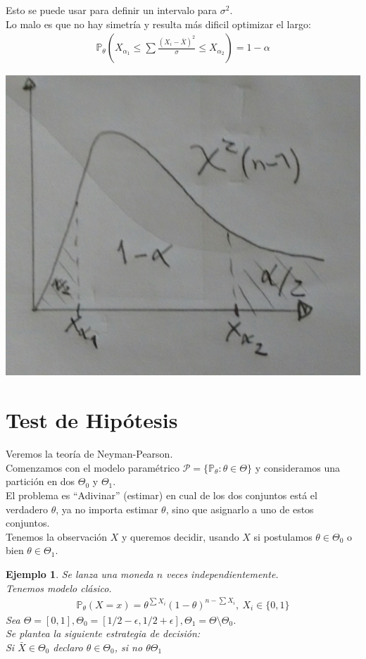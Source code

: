 \documentclass[10pt]{article}
\theoremstyle{plain}
\newtheorem{ej}{Ejemplo}
\theoremstyle{definition}
\begin{document}
 Esto se puede usar para definir un intervalo para $\sigma^2$.\\
 Lo malo es que no hay simetría y resulta más dificil optimizar el largo:
 \begin{align*}
 \mathbb{P}_{\theta}(X_{\alpha_{1}}\le \sum {\frac{(X_{i}-\bar{X})^2}{\sigma}} \le X_{\alpha_{2}}) = 1-\alpha
 \end{align*}
 \begin{center}
 \includegraphics[scale=0.2]{imagenes/distr3.jpg}
 \end{center}
 \section{Test de Hipótesis}
 Veremos la teoría de Neyman-Pearson.\\
 
 Comenzamos con el modelo paramétrico $\mathcal{P} = \{\mathbb{P}_{\theta}\colon \theta \in \Theta\}$ y consideramos una partición en dos $\Theta_{0}$ y $\Theta_{1}$.\\
 
 El problema es ``Adivinar'' (estimar) en cual de los dos conjuntos está el verdadero $\theta$, ya no importa estimar $\theta$, sino que asignarlo a uno de estos conjuntos.\\
 
 Tenemos la observación $X$ y queremos decidir, usando $X$ si postulamos $\theta \in \Theta_{0}$ o bien $\theta \in \Theta_{1}$.
 
 \begin{ej}
 Se lanza una moneda $n$ veces independientemente.\\
 Tenemos modelo clásico.
 \begin{align*}
 \mathbb{P}_{\theta}(X=x) = \theta^{\sum X_{i}}(1-\theta)^{n-\sum X_{i}},\ X_{i}\in \{0,1\}
 \end{align*}
 Sea $\Theta = [0,1], \Theta_{0} = [1/2-\epsilon, 1/2+\epsilon], \Theta_{1} = \Theta \setminus \Theta_{0}$.\\
 Se plantea la siguiente estrategia de decisión:\\
 Si $\bar{X}\in \Theta_{0}$ declaro $\theta \in \Theta_{0}$, si no $\theta \Theta_{1}$
 \end{ej}
\end{document}
